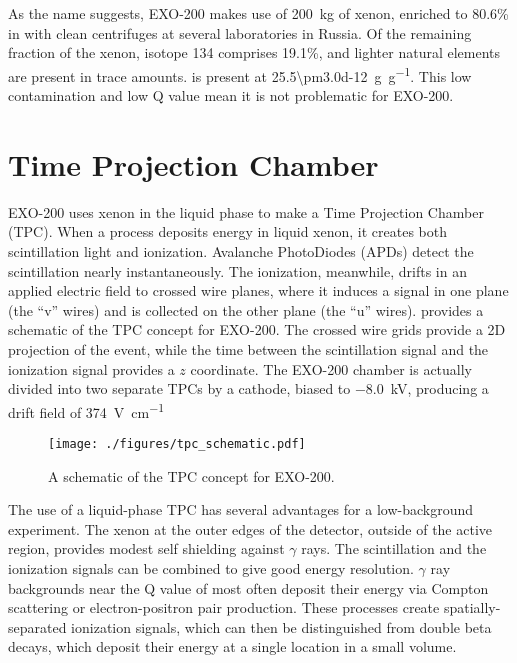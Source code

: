 \documentclass[herrin-thesis.tex]{subfiles}
\begin{document}
As the name suggests, EXO-200 makes use of \SI{200}{\kg} of xenon, enriched to 80.6\% in  with clean centrifuges at several laboratories in Russia. Of the remaining fraction of the xenon, isotope 134 comprises 19.1\%, and lighter natural elements are present in trace amounts.  is present at \SI[per-mode=symbol]{25.5\pm3.0d-12}{\g\per\g}\cite{Dobi:2012nx}. This low contamination and low Q value mean it is not problematic for EXO-200.

\section{Time Projection Chamber}
EXO-200 uses xenon in the liquid phase to make a Time Projection Chamber (TPC). When a process deposits energy in liquid xenon, it creates both scintillation light and ionization. Avalanche PhotoDiodes (APDs) detect the scintillation nearly instantaneously. The ionization, meanwhile, drifts in an applied electric field to crossed wire planes, where it induces a signal in one plane (the ``v'' wires) and is collected on the other plane (the ``u'' wires).  provides a schematic of the TPC concept for EXO-200. The crossed wire grids provide a 2D projection of the event, while the time between the scintillation signal and the ionization signal provides a \(z\) coordinate. The EXO-200 chamber is actually divided into two separate TPCs by a cathode, biased to \SI{-8.0}{\kV}, producing a drift field of \SI{374}{\V\per\cm}

\begin{figure}
\centering
\texttt{[image: ./figures/tpc\_schematic.pdf]}
\caption[A schematic of a TPC]{A schematic of the TPC concept for EXO-200.}
\label{fig:detector_tpc_cartoon}
\end{figure}

The use of a liquid-phase TPC has several advantages for a low-background experiment. The xenon at the outer edges of the detector, outside of the active region, provides modest self shielding against \(\gamma\) rays. The scintillation and the ionization signals can be combined to give good energy resolution\cite{Conti:2003tg}\cite{Aprile:2007hc}. \(\gamma\) ray backgrounds near the Q value of  most often deposit their energy via Compton scattering or electron-positron pair production. These processes create spatially-separated ionization signals, which can then be distinguished from double beta decays, which deposit their energy at a single location in a small volume.
\end{document}
